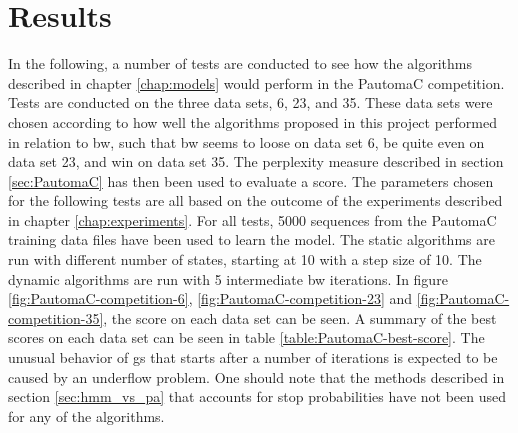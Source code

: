 \chapter{Results}
\label{chap:results}
In the following, a number of tests are conducted to see how the algorithms described in chapter \ref{chap:models} would perform in the PautomaC competition. Tests are conducted on the three data sets, 6, 23, and 35. These data sets were chosen according to how well the algorithms proposed in this project performed in relation to \gls{bw}, such that \gls{bw} seems to loose on data set 6, be quite even on data set 23, and win on data set 35.
The perplexity measure described in section \ref{sec:PautomaC} has then been used to evaluate a score.
The parameters chosen for the following tests are all based on the outcome of the experiments described in chapter \ref{chap:experiments}.
For all tests, 5000 sequences from the PautomaC training data files have been used to learn the model. The static algorithms are run with different number of states, starting at 10 with a step size of 10.
The dynamic algorithms are run with 5 intermediate \gls{bw} iterations.
In figure \ref{fig:PautomaC-competition-6}, \ref{fig:PautomaC-competition-23} and \ref{fig:PautomaC-competition-35}, the score on each data set can be seen.
A summary of the best scores on each data set can be seen in table \ref{table:PautomaC-best-score}.
The unusual behavior of \gls{gs} that starts after a number of iterations is expected to be caused by an underflow problem.
One should note that the methods described in section \ref{sec:hmm_vs_pa} that accounts for stop probabilities have not been used for any of the algorithms.


